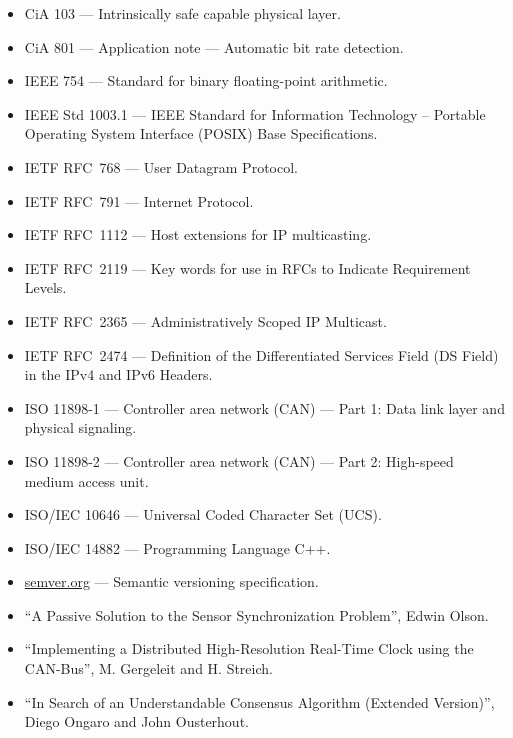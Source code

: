 \begin{itemize}
    \item CiA 103 --- Intrinsically safe capable physical layer.
    \item CiA 801 --- Application note --- Automatic bit rate detection.

    \item IEEE 754 --- Standard for binary floating-point arithmetic.
    \item IEEE Std 1003.1 --- IEEE Standard for Information Technology --
          Portable Operating System Interface (POSIX) Base Specifications.

    \item IETF RFC~768 --- User Datagram Protocol.
    \item IETF RFC~791 --- Internet Protocol.
    \item IETF RFC~1112 --- Host extensions for IP multicasting.
    \item IETF RFC~2119 --- Key words for use in RFCs to Indicate Requirement Levels.
    \item IETF RFC~2365 --- Administratively Scoped IP Multicast.
    \item IETF RFC~2474 --- Definition of the Differentiated Services Field (DS Field) in the IPv4 and IPv6 Headers.

    \item ISO 11898-1 --- Controller area network (CAN) --- Part 1: Data link layer and physical signaling.
    \item ISO 11898-2 --- Controller area network (CAN) --- Part 2: High-speed medium access unit.
    \item ISO/IEC 10646 --- Universal Coded Character Set (UCS).
    \item ISO/IEC 14882 --- Programming Language C++.

    \item \href{http://semver.org}{semver.org} --- Semantic versioning specification.

    \item ``A Passive Solution to the Sensor Synchronization Problem'', Edwin Olson.
    \item ``Implementing a Distributed High-Resolution Real-Time Clock using the CAN-Bus'', M. Gergeleit and H. Streich.
    \item ``In Search of an Understandable Consensus Algorithm (Extended Version)'', Diego Ongaro and John Ousterhout.
\end{itemize}

